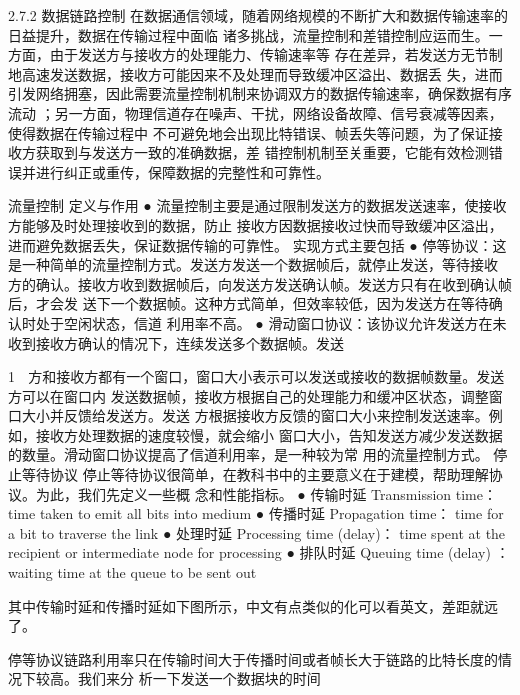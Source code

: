 
2.7.2 数据链路控制
 在数据通信领域，随着网络规模的不断扩大和数据传输速率的日益提升，数据在传输过程中面临
诸多挑战，流量控制和差错控制应运而生。一方面，由于发送方与接收方的处理能力、传输速率等
存在差异，若发送方无节制地高速发送数据，接收方可能因来不及处理而导致缓冲区溢出、数据丢
失，进而引发网络拥塞，因此需要流量控制机制来协调双方的数据传输速率，确保数据有序流动
；另一方面，物理信道存在噪声、干扰，网络设备故障、信号衰减等因素，使得数据在传输过程中
不可避免地会出现比特错误、帧丢失等问题，为了保证接收方获取到与发送方一致的准确数据，差
错控制机制至关重要，它能有效检测错误并进行纠正或重传，保障数据的完整性和可靠性。




流量控制
定义与作用
●   流量控制主要是通过限制发送方的数据发送速率，使接收方能够及时处理接收到的数据，防止
    接收方因数据接收过快而导致缓冲区溢出，进而避免数据丢失，保证数据传输的可靠性。
实现方式主要包括
● 停等协议：这是一种简单的流量控制方式。发送方发送一个数据帧后，就停止发送，等待接收
  方的确认。接收方收到数据帧后，向发送方发送确认帧。发送方只有在收到确认帧后，才会发
  送下一个数据帧。这种方式简单，但效率较低，因为发送方在等待确认时处于空闲状态，信道
  利用率不高。
● 滑动窗口协议：该协议允许发送方在未收到接收方确认的情况下，连续发送多个数据帧。发送


                                            1
     方和接收方都有一个窗口，窗口大小表示可以发送或接收的数据帧数量。发送方可以在窗口内
     发送数据帧，接收方根据自己的处理能力和缓冲区状态，调整窗口大小并反馈给发送方。发送
     方根据接收方反馈的窗口大小来控制发送速率。例如，接收方处理数据的速度较慢，就会缩小
     窗口大小，告知发送方减少发送数据的数量。滑动窗口协议提高了信道利用率，是一种较为常
     用的流量控制方式。
停止等待协议
停止等待协议很简单，在教科书中的主要意义在于建模，帮助理解协议。为此，我们先定义一些概
念和性能指标。
 ● 传输时延 Transmission time： time taken to emit all bits into medium
 ● 传播时延 Propagation time： time for a bit to traverse the link
 ● 处理时延 Processing time (delay)： time spent at the recipient or intermediate node for
   processing
 ● 排队时延 Queuing time (delay) ：waiting time at the queue to be sent out

其中传输时延和传播时延如下图所示，中文有点类似的化可以看英文，差距就远了。




停等协议链路利用率只在传输时间大于传播时间或者帧长大于链路的比特长度的情况下较高。我们来分
析一下发送一个数据块的时间

